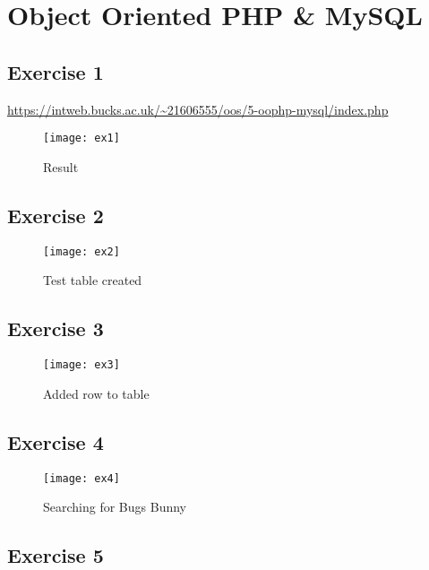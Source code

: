 \chapter{Object Oriented PHP \& MySQL}
\graphicspath{{5-oophp-mysql/images/}}

\section{Exercise 1}

\url{https://intweb.bucks.ac.uk/~21606555/oos/5-oophp-mysql/index.php}

\captionsetup{type=figure}


\clearpage
\captionsetup{type=figure}


\begin{figure}[H]
  \caption{Result}
  \centering
  \texttt{[image: ex1]}
\end{figure}

\section{Exercise 2}

\begin{figure}[H]
  \caption{Test table created}
  \centering
  \texttt{[image: ex2]}
\end{figure}

\section{Exercise 3}

\begin{figure}[H]
  \caption{Added row to table}
  \centering
  \texttt{[image: ex3]}
\end{figure}

\section{Exercise 4}

\begin{figure}[H]
  \caption{Searching for Bugs Bunny}
  \centering
  \texttt{[image: ex4]}
\end{figure}

\section{Exercise 5}

